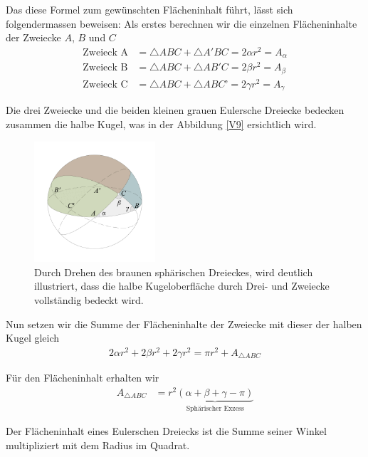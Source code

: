 \begin{refsection}
Das diese Formel zum gewünschten Flächeninhalt führt, lässt sich folgendermassen beweisen:
Als erstes berechnen wir die einzelnen Flächeninhalte der Zweiecke $A$, $B$ und $C$
\begin{align*}
\text{Zweieck A}
&=
\triangle{ABC} + \triangle{A'BC} = 2 \alpha r^{ 2 } = A_{ \alpha }\\
\text{Zweieck B}
&=
\triangle{ABC} + \triangle{AB'C} = 2 \beta r^{ 2 } = A_{ \beta }\\
\text{Zweieck C}
&=
\triangle{ABC} + \triangle{ABC’} = 2 \gamma r^{ 2 } = A_{ \gamma }
\end{align*}

Die drei Zweiecke und die beiden kleinen grauen Eulersche Dreiecke bedecken zusammen die halbe Kugel, was in der Abbildung \eqref{V9} ersichtlich wird.

\begin{figure}[htbp]
\centering
\includegraphics[width=0.4\textwidth]{kugel/HalbeKugel.jpg}
\caption{Durch Drehen des braunen sphärischen Dreieckes, wird deutlich illustriert, dass die halbe Kugeloberfläche durch Drei- und Zweiecke vollständig bedeckt wird.}
\label{V9}
\end{figure}

Nun setzen wir die Summe der Flächeninhalte der Zweiecke mit dieser der halben Kugel gleich
\begin{align*}
2 \alpha r^2 + 2 \beta r^2 + 2 \gamma  r^2 = \pi r^2 + A_{ \triangle{ ABC }}
\end{align*}

Für den Flächeninhalt erhalten wir
\begin{align*}
A_{ \triangle{ ABC }}  &= r^{ 2 }\underbrace{(\alpha + \beta + \gamma - \pi)}_{\text{Sphärischer Exzess}}
\end{align*}

\begin{definition}
Der Flächeninhalt eines Eulerschen Dreiecks ist die Summe seiner Winkel multipliziert mit dem Radius im Quadrat.
\label{skript:kugel:satz:Flaecheninhalt}
\end{definition}



\end{refsection}
